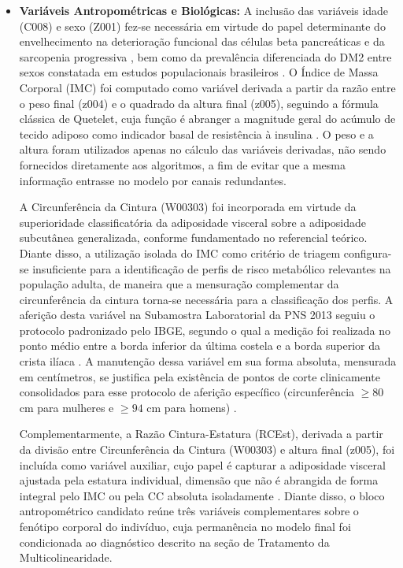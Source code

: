 \begin{itemize}
\item[] \textbf{Variáveis Antropométricas e Biológicas: }
A inclusão das variáveis idade (C008) e sexo (Z001) fez-se necessária em virtude do papel determinante do envelhecimento na deterioração funcional das células beta pancreáticas e da sarcopenia progressiva \cite{mlynarska2025type}, bem como da prevalência diferenciada do DM2 entre sexos constatada em estudos populacionais brasileiros \cite{deAlmeida-Pititto09112015,muzy2021prevalencia,reis2022evolution}. O Índice de Massa Corporal (IMC) foi computado como variável derivada a partir da razão entre o peso final (z004) e o quadrado da altura final (z005), seguindo a fórmula clássica de Quetelet, cuja função é abranger a magnitude geral do acúmulo de tecido adiposo como indicador basal de resistência à insulina \cite{mlynarska2025type}. O peso e a altura foram utilizados apenas no cálculo das variáveis derivadas, não sendo fornecidos diretamente aos algoritmos, a fim de evitar que a mesma informação entrasse no modelo por canais redundantes.

A Circunferência da Cintura (W00303) foi incorporada em virtude da superioridade classificatória da adiposidade visceral sobre a adiposidade subcutânea generalizada, conforme fundamentado no referencial teórico. Diante disso, a utilização isolada do IMC como critério de triagem configura-se insuficiente para a identificação de perfis de risco metabólico relevantes na população adulta, de maneira que a mensuração complementar da circunferência da cintura torna-se necessária para a classificação dos perfis. A aferição desta variável na Subamostra Laboratorial da PNS 2013 seguiu o protocolo padronizado pelo IBGE, segundo o qual a medição foi realizada no ponto médio entre a borda inferior da última costela e a borda superior da crista ilíaca \cite{ibge2013pns}. A manutenção dessa variável em sua forma absoluta, mensurada em centímetros, se justifica pela existência de pontos de corte clinicamente consolidados para esse protocolo de aferição específico (circunferência $\geq 80$ cm para mulheres e $\geq 94$ cm para homens) \cite{SBD2019}.

Complementarmente, a Razão Cintura-Estatura (RCEst), derivada a partir da divisão entre Circunferência da Cintura (W00303) e altura final (z005), foi incluída como variável auxiliar, cujo papel é capturar a adiposidade visceral ajustada pela estatura individual, dimensão que não é abrangida de forma integral pelo IMC ou pela CC absoluta isoladamente \cite{Feller2010}. Diante disso, o bloco antropométrico candidato reúne três variáveis complementares sobre o fenótipo corporal do indivíduo, cuja permanência no modelo final foi condicionada ao diagnóstico descrito na seção de Tratamento da Multicolinearidade.


\end{itemize}
